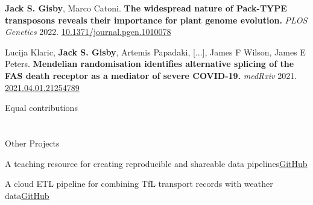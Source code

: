    \item \textbf{Jack S. Gisby}, Marco Catoni. \textbf{The widespread nature of Pack-TYPE transposons reveals their importance for plant genome evolution.} \textit{PLOS Genetics} 2022. \href{https://doi.org/10.1371/journal.pgen.1010078}{10.1371/journal.pgen.1010078}
    
    \item Lucija Klaric\textsuperscript{\textdagger}, \textbf{Jack S. Gisby}\textsuperscript{\textdagger}, Artemis Papadaki\textsuperscript{\textdagger}, [...], James F Wilson\textsuperscript{\textdagger}, James E Peters\textsuperscript{\textdagger}. \textbf{Mendelian randomisation identifies alternative splicing of the FAS death receptor as a mediator of severe COVID-19.} \textit{medRxiv} 2021. \href{https://doi.org/10.1101/2021.04.01.21254789 }{2021.04.01.21254789}
    
    \textdagger Equal contributions \hfill {}
    
\resumeEntryEnd

\section{\faBriefcase}{Other Projects}

  \resumeEntryStart

    \resumeEntryTD
      {A teaching resource for creating reproducible and shareable data pipelines}{\href{https://github.com/ImperialCollegeLondon/ReCoDE_rnaseq_pipeline}{GitHub}}
    \resumeItemListStart
    \resumeItemListEnd

    \resumeEntryTD
      {A cloud ETL pipeline for combining TfL transport records with weather data}{\href{https://github.com/jackgisby/tfl-bikes-data-pipeline}{GitHub}}
    \resumeItemListStart
    \resumeItemListEnd

  \resumeEntryEnd



